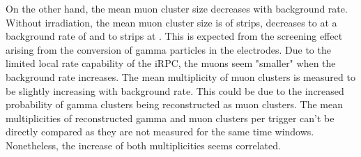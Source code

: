     On the other hand, the mean muon cluster size decreases with background rate. Without irradiation, the mean muon cluster size is of  strips, decreases to  at a background rate of  and to  strips at . This is expected from the screening effect arising from the conversion of gamma particles in the electrodes. Due to the limited local rate capability of the iRPC, the muons seem "smaller" when the background rate increases. The mean multiplicity of muon clusters is measured to be slightly increasing with background rate. This could be due to the increased probability of gamma clusters being reconstructed as muon clusters. The mean multiplicities of reconstructed gamma and muon clusters per trigger can't be directly compared as they are not measured for the same time windows. Nonetheless, the increase of both multiplicities seems correlated.
	 

